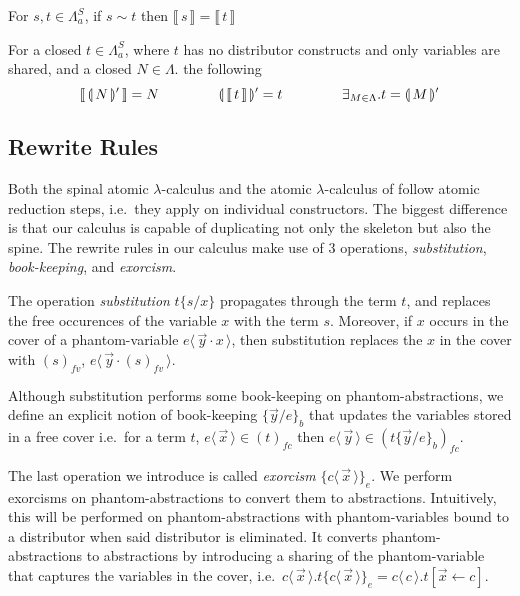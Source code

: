 \documentclass[a4paper,UKenglish,cleveref, autoref]{lipics-v2019}
\newcommand{\FALC}{\Lambda^{S}_{a}}
\newcommand{\fv}[1]{(#1)_{fv}}
\newcommand{\fc}[1]{(#1)_{fc}}
\newcommand{\fake}[3]{#1 \langle \, #2 \, \rangle . #3}
\newcommand{\share}[3]{#1 [#2 \leftarrow #3]}
\newcommand{\fakedist}[2]{#1 \langle \, #2 \, \rangle}
\newcommand{\sub}[3]{#1 \{ #2 / #3 \}}
\newcommand{\psub}[3]{#1 \{ #2 / #3 \}_{b}}
\newcommand{\exor}[3]{#1 \{ \fakedist{#2}{#3} \}_{e}}
\newcommand{\readback}[2]{\llbracket \, #1 \, \rrbracket}
\newcommand{\compile}[1]{\llparenthesis \, #1 \, \rrparenthesis}
\newcommand{\trans}[1]{\llbracket \, #1 \, \rrbracket}
\begin{document}
\begin{lemma}
\label{lem:preservedenotationsim}
For $s, t \in \FALC$, if $s \sim t$ then $\trans{s} = \trans{t}$ 
\end{lemma}

\begin{lemma}
\label{lem:preserve1to1correspondance}
For a closed $t \in \FALC$, where $t$ has no distributor constructs and only variables are shared, and a closed $N \in \Lambda$. the following 
$$\readback{\compile{N}'}{I} = N \hspace{1.5cm} \compile{\readback{t}{I}}' = t \hspace{1.5cm} \exists_{ M \in \Lambda} . t = \compile{M}'$$ 
\end{lemma}

\subsection{Rewrite Rules}

Both the spinal atomic $\lambda$-calculus and the atomic $\lambda$-calculus of \cite{gundersen2013atomic} follow atomic reduction steps, i.e.\ they apply on individual constructors. The biggest difference is that our calculus is capable of duplicating not only the skeleton but also the spine. The rewrite rules in our calculus make use of 3 operations, \emph{substitution}, \emph{book-keeping}, and \emph{exorcism}.

The operation \emph{substitution} $\sub{t}{s}{x}$ propagates through the term $t$, and replaces the free occurences of the variable $x$ with the term $s$. Moreover, if $x$ occurs in the cover of a phantom-variable $\fakedist{e}{\vec{y} \cdot x}$, then substitution replaces the $x$ in the cover with $\fv{s}$, $\fakedist{e}{\vec{y} \cdot \fv{s}}$.

Although substitution performs some book-keeping on phantom-abstractions, we define an explicit notion of book-keeping $\psub{}{\vec{y}}{e}$ that updates the variables stored in a free cover i.e.\ for a term $t$, $\fakedist{e}{\vec{x}} \in \fc{t}$ then $\fakedist{e}{\vec{y}} \in \fc{\psub{t}{\vec{y}}{e}}$.

The last operation we introduce is called \emph{exorcism} $\exor{}{c}{\vec{x}}$. We perform exorcisms on phantom-abstractions to convert them to abstractions. Intuitively, this will be performed on phantom-abstractions with phantom-variables bound to a distributor when said distributor is eliminated. It converts phantom-abstractions to abstractions by introducing a sharing of the phantom-variable that captures the variables in the cover, i.e.\ $\fake{c}{\vec{x}}{t} \exor{}{c}{\vec{x}} = \fake{c}{c}{\share{t}{\vec{x}}{c}}$.
\end{document}
